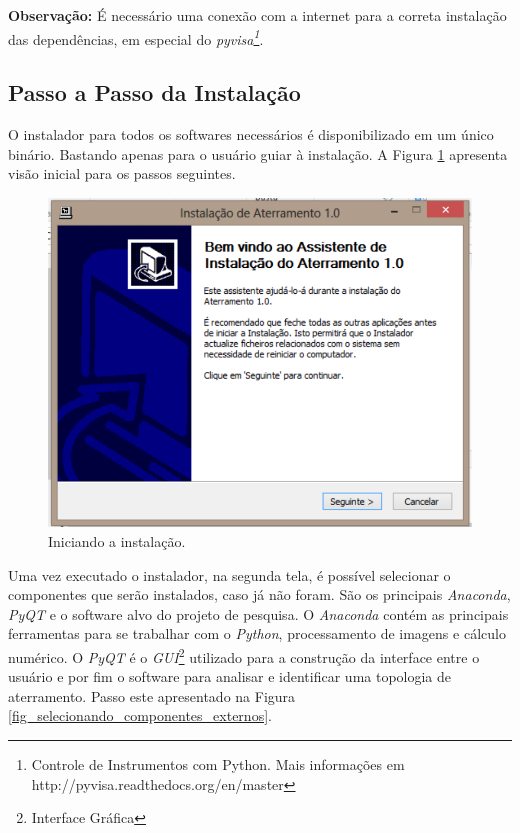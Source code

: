 \documentclass[a4paper, 10pt]{article}
\begin{document}
\textbf{Observação:} É necessário uma conexão com a internet para a correta 
instalação das dependências, em especial do  \textit{pyvisa\footnote{Controle de Instrumentos com Python. Mais informações em http://pyvisa.readthedocs.org/en/master}}.


\subsection{Passo a Passo da Instalação}

O instalador para todos os softwares necessários é disponibilizado em um único
binário. Bastando apenas para o usuário guiar à instalação. A Figura \ref{fig_iniciando_instalacao} apresenta visão inicial para os passos seguintes.

\begin{figure}[!h]
        \caption{\label{fig_iniciando_instalacao}Iniciando a instalação.}
	    \begin{center}
            \includegraphics[scale=0.7]{../fotos/instalacao/parte1_executando.pdf}
	    \end{center}
\end{figure}

Uma vez executado o instalador, na segunda tela, é possível selecionar o componentes 
que serão instalados, caso já não foram. São os principais \textit{Anaconda}, \textit{PyQT} e o software
alvo do projeto de pesquisa. O \textit{Anaconda} contém as principais ferramentas para se
trabalhar com o \textit{Python}, processamento de imagens e cálculo numérico. O \textit{PyQT} é 
o \textit{GUI}\footnote{Interface Gráfica} utilizado para a construção da interface entre o usuário e por fim 
o software para analisar e identificar uma topologia de aterramento. Passo este apresentado 
na Figura \ref{fig_selecionando_componentes_externos}. 
\end{document}
